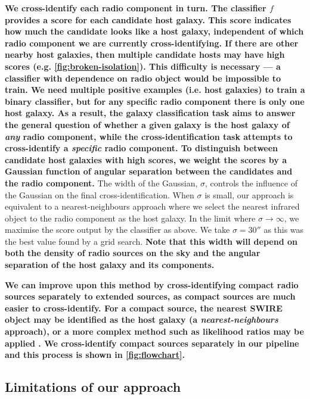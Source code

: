 \documentclass[fleqn,usenatbib,usedcolumn]{mnras}
\newcommand{\edited}[1]{{\bf {#1}}}
\begin{document}
    \edited{We cross-identify each radio component in turn. The classifier $f$
    provides a score for each candidate host galaxy. This score indicates how
    much the candidate looks like a host galaxy, independent of which radio
    component we are currently cross-identifying. If there are other nearby host
    galaxies, then multiple candidate hosts may have high scores (e.g.
    \autoref{fig:broken-isolation}). This difficulty is necessary --- a classifier
    with dependence on radio object would be impossible to train. We
    need multiple positive examples (i.e. host galaxies) to train a binary classifier, but
    for any specific radio component there is only one host galaxy. As a
    result, the galaxy classification task aims to answer the general question
    of whether a given galaxy is the host galaxy of \emph{any} radio
    component, while the cross-identification task attempts to cross-identify
    a \emph{specific} radio component. To distinguish between candidate host
    galaxies with high scores, we weight the scores by a Gaussian function of
    angular separation between the candidates and the radio component.} The
    width of the Gaussian, $\sigma$, controls the influence of the Gaussian on
    the final cross-identification. When $\sigma$ is small, our approach is
    equivalent to a nearest-neighbours approach where we select the nearest
    infrared object to the radio component as the host galaxy. In the limit
    where $\sigma \to \infty$, we maximise the score output by the
    classifier as above. We take $\sigma = 30''$ as this was the best value
    found by a grid search. \edited{Note that this width will depend on both
    the density of radio sources on the sky and the angular separation of the
    host galaxy and its components.}

    \edited{We can improve upon this method by cross-identifying compact radio sources
    separately to extended sources, as compact sources are much easier to
    cross-identify. For a compact source, the nearest SWIRE object may be
    identified as the host galaxy (a \emph{nearest-neighbours} approach), or a
    more complex method such as likelihood ratios may be applied
    \citep[see][]{weston18lrpy}. We cross-identify compact sources separately
    in our pipeline and this process is shown in \autoref{fig:flowchart}.}

  \subsection{Limitations of our approach}
    \label{sec:limitations}
\end{document}
